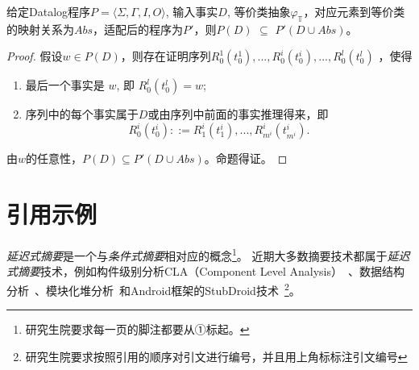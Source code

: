 \begin{theorem}[正确性]\label{chap4:sound}
给定Datalog程序$P = \langle \Sigma, \Gamma, I, O \rangle$, 输入事实$D$, 等价类抽象$\varphi_\mathbb{T}$，对应元素到等价类的映射关系为$Abs$，适配后的程序为$P'$，则$P(D)$ $\subseteq$ $P'(D \cup Abs)$。
\end{theorem}
\begin{proof}
假设$w \in P(D)$，则存在证明序列$R^1_{0}(t^1_0), ..., R^i_{0}(t^i_0), ..., R^l_{0}(t^l_0)$%
，使得
\begin{enumerate}
\item 
最后一个事实是 $w$, 即 $R^l_{0}(t^l_0) = w$;
\item 
序列中的每个事实属于$D$或由序列中前面的事实推理得来，即 
\[
R^i_{0}(t^i_0) ::= R^i_{1}(t^i_1), ..., R^i_{m^i}(t^i_{m^i}).
\]
\end{enumerate}

由$w$的任意性，$P(D) \subseteq P'(D \cup Abs)$。命题得证。

\end{proof}

\section{引用示例}

\textit{延迟式摘要}是一个与\textit{条件式摘要}相对应的概念\footnote{研究生院要求每一页的脚注都要从①标起。}。
近期大多数摘要技术都属于\textit{延迟式摘要}技术，例如构件级别分析CLA（Component Level Analysis）~\supercite{rountev2006interprocedural,DBLP:conf/cc/RountevSX08}、数据结构分析~\supercite{DBLP:conf/pldi/LattnerLA07}、模块化堆分析~\supercite{Madhaven2012modular}和Android框架的StubDroid技术~\supercite{BoddenICSE16}\footnote{研究生院要求按照引用的顺序对引文进行编号，并且用上角标标注引文编号}。


